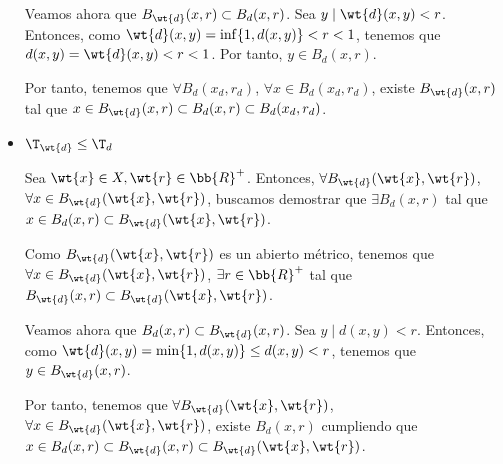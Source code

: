 \begin{ejercicio}
\begin{itemize}
        Veamos ahora que $B_{\wt{d}}(x,r)\subset B_d(x,r)$. Sea $y\mid \wt{d}(x,y)<r$. Entonces, como $\wt{d}(x,y)=\inf\{1,d(x,y)\}<r<1$, tenemos que $d(x,y)=\wt{d}(x,y)<r<1$. Por tanto, $y\in B_d(x,r)$.

        Por tanto, tenemos que $\forall B_d(x_d,r_d)$, $\forall x\in B_d(x_d,r_d)$, existe $B_{\wt{d}}(x,r)$ tal que $x\in B_{\wt{d}}(x,r)\subset B_d(x,r) \subset  B_d(x_d,r_d)$.

        \item \ul{$\T_{\wt{d}}\leq \T_d$}

        Sea $\wt{x}\in X, \wt{r}\in \bb{R}^+$. Entonces, $\forall B_{\wt{d}}(\wt{x},\wt{r})$, $\forall x\in B_{\wt{d}}(\wt{x},\wt{r})$, buscamos demostrar que $\exists B_d(x,r)$ tal que $x\in B_d(x,r)\subset B_{\wt{d}}(\wt{x},\wt{r})$.

        Como $B_{\wt{d}}(\wt{x},\wt{r})$ es un abierto métrico, tenemos que $\forall x\in B_{\wt{d}}(\wt{x},\wt{r})$, $\exists r\in \bb{R}^+$ tal que $B_{\wt{d}}(x, r)\subset B_{\wt{d}}(\wt{x},\wt{r})$.

        Veamos ahora que $B_d(x,r)\subset B_{\wt{d}}(x,r)$. Sea $y\mid d(x,y)<r$. Entonces, como $\wt{d}(x,y)=\min\{1,d(x,y)\}\leq d(x,y)<r$, tenemos que $y\in B_{\wt{d}}(x,r)$.
        
        Por tanto, tenemos que $\forall B_{\wt{d}}(\wt{x},\wt{r})$, $\forall x\in B_{\wt{d}}(\wt{x},\wt{r})$, existe $B_d(x,r)$ cumpliendo que $x\in B_d(x,r)\subset B_{\wt{d}}(x,r)\subset B_{\wt{d}}(\wt{x},\wt{r})$.
        
    \end{itemize}
\end{ejercicio}

